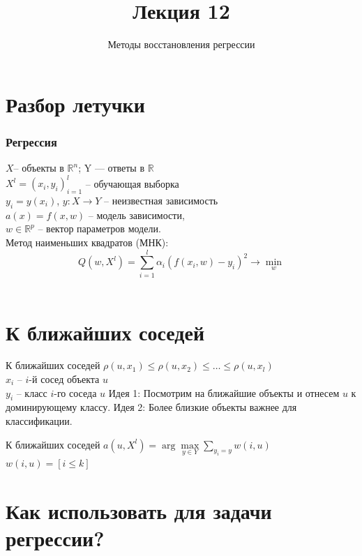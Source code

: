 \documentclass[10pt]{beamer}
\title{Лекция 12}
\subtitle{Методы восстановления регрессии}
\begin{document}
\section{Разбор летучки}

\maketitle

\begin{frame}\frametitle{Регрессия}
	$X$-- объекты в $\mathbb{R}^n$; Y — ответы в $\mathbb{R}$\\
	$X^l = (x_i, y_i)_{i=1}^l$ -- обучающая выборка\\
	$y_i = y(x_i)$,  $y : X \rightarrow Y$ -- неизвестная зависимость\\
	\bigbreak
	$a(x) = f (x, w)$ -- модель зависимости,\\
	$w \in \mathbb{R}^p$ -- вектор параметров модели.\\
	\bigbreak
	Метод наименьших квадратов (МНК):\\
	$$Q(w,X^l) = \sum\limits_{i=1}^l \alpha_i (f (x_i, w) - y_i)^2 \rightarrow \min\limits_{w}$$\\
\end{frame}

\section{К ближайших соседей}

\begin{frame}{К ближайших соседей}
  ${\rho(u, x_1) \leq \rho(u, x_2) \leq \dots \leq \rho(u, x_l)}$\\
  \bigbreak
	${x_i}$ -- $i$-й сосед объекта $u$\\
	${y_i}$ -- класс $i$-го соседа $u$
  \bigbreak
  \alert{Идея 1}: Посмотрим на ближайшие объекты и отнесем $u$ к доминирующему классу. 
  \bigbreak
  \pause
  \alert{Идея 2}: Более близкие объекты важнее для классификации.
\end{frame}

\begin{frame}{К ближайших соседей}
  $a(u, X^l) = \arg\max\limits_{y \in Y} \sum\limits_{y_i = y} w(i, u)$\\
  \bigbreak
  ${w(i, u) = [i \leq k]}$
\end{frame}

\section{Как использовать для задачи регрессии?}
\end{document}
